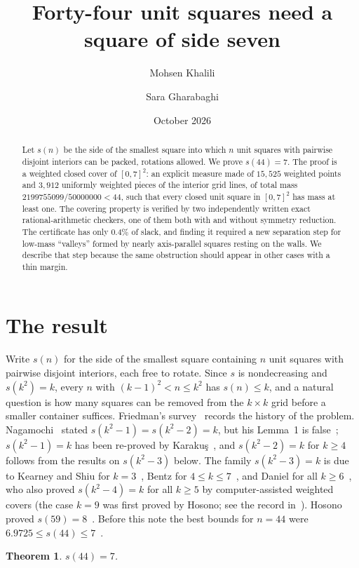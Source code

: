 \documentclass[11pt]{amsart}
\title{Forty-four unit squares need a square of side seven}
\author{Mohsen Khalili}
\author{Sara Gharabaghi}
\date{October 2026}
\newtheorem{theorem}{Theorem}
\theoremstyle{remark}
\begin{document}
\begin{abstract}
Let $s(n)$ be the side of the smallest square into which $n$ unit squares with pairwise disjoint interiors can be
packed, rotations allowed. We prove $s(44)=7$. The proof is a weighted closed cover of $[0,7]^2$: an explicit
measure made of $15{,}525$ weighted points and $3{,}912$ uniformly weighted pieces of the interior grid lines, of
total mass $2199755099/50000000<44$, such that every closed unit square in $[0,7]^2$ has mass at least one. The
covering property is verified by two independently written exact rational-arithmetic checkers, one of them both
with and without symmetry reduction. The certificate has only $0.4\%$ of slack, and finding it required a new
separation step for low-mass ``valleys'' formed by nearly axis-parallel squares resting on the walls. We describe
that step because the same obstruction should appear in other cases with a thin margin.
\end{abstract}
\maketitle

\section{The result}

Write $s(n)$ for the side of the smallest square containing $n$ unit squares with pairwise disjoint interiors,
each free to rotate. Since $s$ is nondecreasing and $s(k^2)=k$, every $n$ with $(k-1)^2<n\le k^2$ has $s(n)\le k$,
and a natural question is how many squares can be removed from the $k\times k$ grid before a smaller container
suffices. Friedman's survey~\cite{friedman} records the history of the problem. Nagamochi~\cite{nagamochi} stated
$s(k^2-1)=s(k^2-2)=k$, but his Lemma~1 is false~\cite{karakus}; $s(k^2-1)=k$ has been re-proved by
Karaku\c{s}~\cite{karakus}, and $s(k^2-2)=k$ for $k\ge4$ follows from the results on $s(k^2-3)$ below. The family $s(k^2-3)=k$ is due to Kearney and Shiu for $k=3$~\cite{kearney},
Bentz for $4\le k\le7$~\cite{bentz,bentz2}, and Daniel for all $k\ge6$~\cite{daniel}, who also proved
$s(k^2-4)=k$ for all $k\ge5$ by computer-assisted weighted covers (the case $k=9$ was first proved by Hosono; see
the record in~\cite{daniel}). Hosono proved $s(59)=8$~\cite{hosono59}. Before
this note the best bounds for $n=44$ were $6.9725\le s(44)\le7$~\cite{case44}.

\begin{theorem}\label{thm:main}
$s(44)=7$.
\end{theorem}
\end{document}
